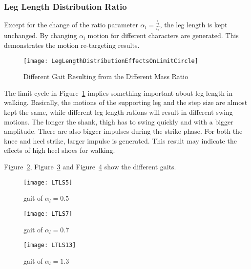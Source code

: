 \subsubsection*{Leg Length Distribution Ratio}
Except for the change of the ratio parameter  $\alpha_l=\frac{l_t}{l_s}$, the leg length is kept unchanged.
By changing $\alpha_l$ motion for different characters are generated.
This demonstrates the motion re-targeting results.


\begin{figure}[!htbp]
  \begin{center}
      \texttt{[image: LegLengthDistributionEffectsOnLimitCircle]}
    \caption{Different Gait Resulting from the Different Mass Ratio}
    \label{fig:differentlr}
\end{center}
\end{figure}

The limit cycle in Figure~\ref{fig:differentlr} implies something important about leg length in walking.
Basically, the  motions of the supporting leg and the step size are almost kept the same, while different leg length rations will result in different swing motions.
The longer the shank, thigh has to swing quickly and with a bigger amplitude.
There are also bigger impulses during the strike phase. 
For both the knee and heel strike, larger impulse is generated.
This result may indicate the effects of high heel shoes for walking.

Figure~\ref{fig:lr1}, Figure~\ref{fig:lr2} and Figure~\ref{fig:lr3} show the different gaits.
\begin{figure}[!htbp]
  \begin{center}
      \texttt{[image: LTLS5]}
    \caption{gait of $\alpha_l=0.5$}
    \label{fig:lr1}
\end{center}
\end{figure}

\begin{figure}[!htbp]
  \begin{center}
      \texttt{[image: LTLS7]}
    \caption{gait of $\alpha_l=0.7$}
    \label{fig:lr2}
\end{center}
\end{figure}

\begin{figure}[!htbp]
  \begin{center}
      \texttt{[image: LTLS13]}
    \caption{gait of $\alpha_l=1.3$}
    \label{fig:lr3}
\end{center}
\end{figure}





